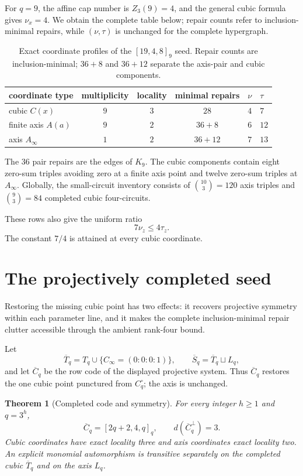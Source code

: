 \documentclass[11pt]{article}
\newtheorem{theorem}{Theorem}[section]
\theoremstyle{definition}
\theoremstyle{remark}
\begin{document}
For $q=9$, the affine cap number is $Z_3(9)=4$, and the general cubic formula
gives $\nu_x=4$.  We obtain the complete table below; repair counts refer to
inclusion-minimal repairs, while $(\nu,\tau)$ is unchanged for the complete
hypergraph.

\begin{table}[ht]
\centering
\begin{tabular}{@{}lccccl@{}}
\toprule
coordinate type & multiplicity & locality & minimal repairs & $\nu$ & $\tau$ \\
\midrule
cubic $C(x)$       & $9$ & $3$ & $28$      & $4$ & $7$ \\
finite axis $A(a)$ & $9$ & $2$ & $36+8$    & $6$ & $12$ \\
axis $A_\infty$    & $1$ & $2$ & $36+12$   & $7$ & $13$ \\
\bottomrule
\end{tabular}
\caption{Exact coordinate profiles of the $[19,4,8]_9$ seed.  Repair counts
are inclusion-minimal; $36+8$ and $36+12$ separate the axis-pair and cubic
components.}
\label{tab:q9}
\end{table}

The $36$ pair repairs are the edges of $K_9$.  The cubic components contain
eight zero-sum triples avoiding zero at a finite axis point and twelve
zero-sum triples at $A_\infty$.  Globally, the small-circuit inventory consists of
$\binom{10}{3}=120$ axis triples and $\binom93=84$ completed cubic
four-circuits.

These rows also give the uniform ratio
\[
 7\nu_z\leq4\tau_z.
\]
The constant $7/4$ is attained at every cubic coordinate.

\section{The projectively completed seed}
\label{sec:projective-completion}

Restoring the missing cubic point has two effects: it recovers projective
symmetry within each parameter line, and it makes the complete
inclusion-minimal repair clutter accessible through the ambient rank-four
bound.

Let
\[
 \overline T_q=T_q\cup\{C_\infty=(0:0:0:1)\},
 \qquad \overline S_q=\overline T_q\sqcup L_q,
\]
and let $\overline C_q$ be the row code of the displayed projective system.
Thus $\overline C_q$ restores the one cubic point punctured from $C_q^\circ$; the
axis is unchanged.

\begin{theorem}[Completed code and symmetry]
\label{thm:completed-parameters}
For every integer $h\geq1$ and $q=3^h$,
\[
 \overline C_q=[2q+2,4,q]_q,
 \qquad d(\overline C_q^\perp)=3.
\]
Cubic coordinates have exact locality three and axis coordinates exact
locality two.  An explicit monomial automorphism is transitive separately on
the completed cubic $\overline T_q$ and on the axis $L_q$.
\end{theorem}
\end{document}
